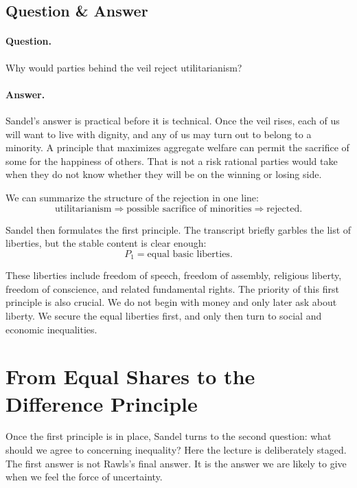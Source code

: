 \subsection{Question \& Answer}

\paragraph{Question.} Why would parties behind the veil reject utilitarianism?

\paragraph{Answer.} Sandel's answer is practical before it is technical. Once the veil rises, each of us will want to live with dignity, and any of us may turn out to belong to a minority. A principle that maximizes aggregate welfare can permit the sacrifice of some for the happiness of others. That is not a risk rational parties would take when they do not know whether they will be on the winning or losing side.

We can summarize the structure of the rejection in one line:
\begin{equation}
\text{utilitarianism}
\Longrightarrow
\text{possible sacrifice of minorities}
\Longrightarrow
\text{rejected}.
\end{equation}

Sandel then formulates the first principle. The transcript briefly garbles the list of liberties, but the stable content is clear enough:
\begin{equation}
P_1=\text{equal basic liberties}.
\end{equation}

These liberties include freedom of speech, freedom of assembly, religious liberty, freedom of conscience, and related fundamental rights. The priority of this first principle is also crucial. We do not begin with money and only later ask about liberty. We secure the equal liberties first, and only then turn to social and economic inequalities.

\section{From Equal Shares to the Difference Principle}

Once the first principle is in place, Sandel turns to the second question: what should we agree to concerning inequality? Here the lecture is deliberately staged. The first answer is not Rawls's final answer. It is the answer we are likely to give when we feel the force of uncertainty.


